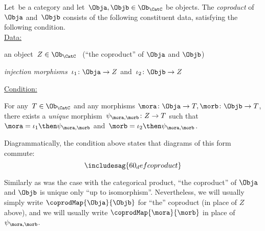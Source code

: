 \begin{ctdefinition}[Coproduct]
\label{def:catcoproduct}
Let~\CatC be a category and let~$\Obja, \Objb \in \Ob_{\CatC}$ be objects. The \emph{coproduct} of~$\Obja$ and~$\Objb$ consists of the following constituent data, satisfying the following condition. \\
\underline{Data:}
\begin{compactenum}
\item an object~$Z \in \Ob_{\CatC}$ \ (``the coproduct'' of $\Obja$ and $\Objb$)
\item \emph{injection morphisms}~$\iota_1 \colon \Obja \to Z $ and~$\iota_2 \colon \Objb \to Z$
\end{compactenum}
\underline{Condition:}
\begin{compactenum}
\item For any~$T \in \Ob_{\CatC}$ and any morphisms $\mora \colon  \Obja \to T, \morb \colon \Objb \to T$, there exists a \emph{unique} morphism~$\psi_{\mora, \morb} \colon Z \to T$ such that~$\mora = \iota_1\then \psi_{\mora, \morb}$ and~$\morb = \iota_2 \then \psi_{\mora,\morb}$.
\end{compactenum}
\end{ctdefinition}


\begin{remark}
Diagrammatically, the condition above states that diagrams of this form commute:
\begin{equation}
\includesag{60_defcoproduct}
\end{equation}
\end{remark}

\begin{remark}
Similarly as was the case with the categorical product, ``the coproduct'' of $\Obja$ and $\Objb$ is unique only ``up to isomorphism''. Nevertheless, we will usually simply write $\coprodMap{\Obja}{\Objb}$ for ``the'' coproduct (in place of $Z$ above), and we will usually write $\coprodMap{\mora}{\morb}$ in place of $\psi_{\mora, \morb}$.
\end{remark}

%
%


%

